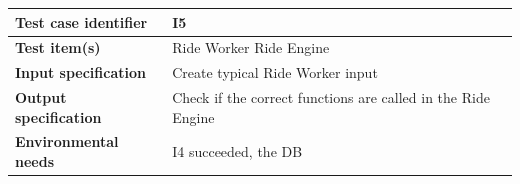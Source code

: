 \documentclass[a4paper,11pt]{report} %
\begin{document}
			\begin{center}
				\renewcommand{\arraystretch}{1.2}
				\setlength{\tabcolsep}{24pt}
				\begin{tabular}{ l  p{9cm}}\hline
					\textbf{Test case identifier} & I5\\\hline
					\textbf{Test item(s)} & Ride Worker \textrightarrow Ride Engine\\\hline
					\textbf{Input specification} & Create typical Ride Worker input \\\hline
					\textbf{Output specification} & Check if the correct functions are called in the Ride Engine\\\hline
					\textbf{Environmental needs} & I4 succeeded, the DB\\\hline
				\end{tabular}
			\end{center}			
			
		\pagebreak
\end{document}
